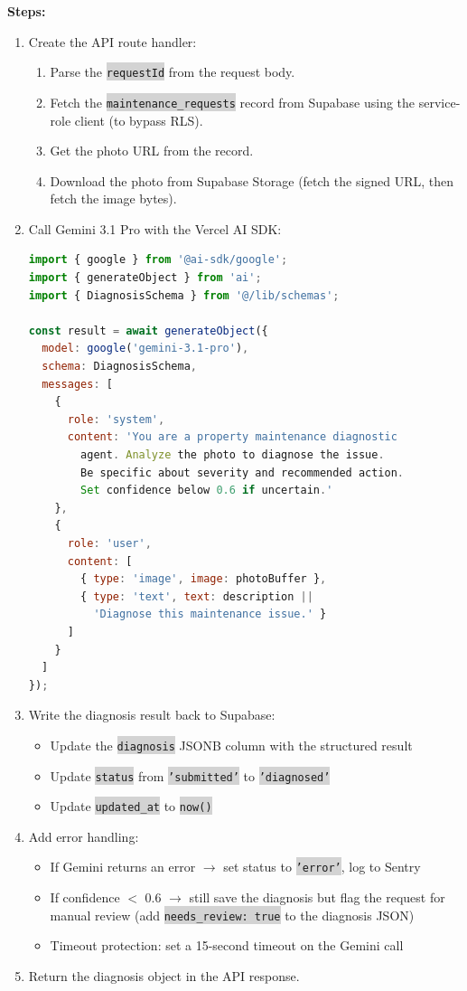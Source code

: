 \documentclass[11pt, a4paper]{article}
\newcommand{\code}[1]{\texttt{\small\colorbox{lightgray}{#1}}}
\begin{document}
\textbf{Steps:}
\begin{enumerate}[leftmargin=2em, itemsep=2pt]
  \item Create the API route handler:
    \begin{enumerate}[itemsep=1pt]
      \item Parse the \code{requestId} from the request body.
      \item Fetch the \code{maintenance\_requests} record from Supabase using the service-role client (to bypass RLS).
      \item Get the photo URL from the record.
      \item Download the photo from Supabase Storage (fetch the signed URL, then fetch the image bytes).
    \end{enumerate}

  \item Call Gemini 3.1 Pro with the Vercel AI SDK:
\begin{lstlisting}[language=JavaScript]
import { google } from '@ai-sdk/google';
import { generateObject } from 'ai';
import { DiagnosisSchema } from '@/lib/schemas';

const result = await generateObject({
  model: google('gemini-3.1-pro'),
  schema: DiagnosisSchema,
  messages: [
    {
      role: 'system',
      content: 'You are a property maintenance diagnostic
        agent. Analyze the photo to diagnose the issue.
        Be specific about severity and recommended action.
        Set confidence below 0.6 if uncertain.'
    },
    {
      role: 'user',
      content: [
        { type: 'image', image: photoBuffer },
        { type: 'text', text: description || 
          'Diagnose this maintenance issue.' }
      ]
    }
  ]
});
\end{lstlisting}

  \item Write the diagnosis result back to Supabase:
    \begin{itemize}[itemsep=1pt]
      \item Update the \code{diagnosis} JSONB column with the structured result
      \item Update \code{status} from \code{'submitted'} to \code{'diagnosed'}
      \item Update \code{updated\_at} to \code{now()}
    \end{itemize}

  \item Add error handling:
    \begin{itemize}[itemsep=1pt]
      \item If Gemini returns an error $\rightarrow$ set status to \code{'error'}, log to Sentry
      \item If confidence $<$ 0.6 $\rightarrow$ still save the diagnosis but flag the request for manual review (add \code{needs\_review: true} to the diagnosis JSON)
      \item Timeout protection: set a 15-second timeout on the Gemini call
    \end{itemize}

  \item Return the diagnosis object in the API response.
\end{enumerate}
\end{document}

